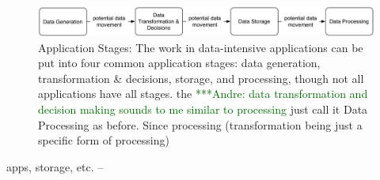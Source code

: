 \documentclass[times]{cpeauth}
\newcommand{\alnote}[1]{ {\textcolor{darkgreen} { ***Andre: #1 }}}
\begin{document}
\begin{figure}[htbp] \centering
        \includegraphics[width=1.0\textwidth]{figures/application-stages-new.pdf}
        \caption{Application Stages: The work in data-intensive applications can
be put into four common application stages: data generation, transformation \&
decisions, storage, and processing, though not all applications have all stages.
the %
\alnote{data transformation and decision making sounds to me similar to
processing} %
just call it Data Processing as before. Since %
processing (transformation being just a specific form of processing)}
\katznote{I want to distinguish between the processing that happens before
storage %
changing this.  %
                \label{fig:figures_application-stages}}
\end{figure}


apps, %
storage, etc. -- %

\end{document}
